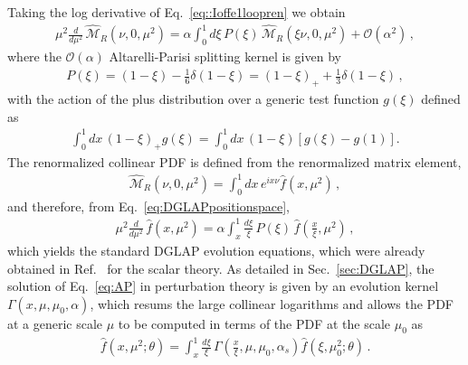 Taking the log derivative of Eq.~\eqref{eq::Ioffe1loopren} we obtain
\begin{align}
        \label{eq:DGLAPpositionspace}
        \mu^2\frac{d}{d\mu^2}\, \widehat{\mathcal{M}}_R\left(\nu,0,\mu^2\right) 
        = \alpha\int_0^1 d\xi\,P\left(\xi\right)\,\widehat{\mathcal{M}}_R\left(\xi\nu,0,\mu^2\right) 
        + \mathcal{O}\left(\alpha^2\right)\, ,
\end{align}
where the $\mathcal{O}\left(\alpha\right)$ Altarelli-Parisi splitting kernel is given by
\begin{align}
        \label{eq:AltarelliParisikernel}
        P\left(\xi\right) = 
        \left(1-\xi\right) - \frac{1}{6}\delta\left(1-\xi\right) = 
        \left(1-\xi\right)_+ + \frac{1}{3}\delta\left(1-\xi\right)\, ,
\end{align}
with the action of the plus distribution over a generic test function $g\left(\xi\right)$ defined as
\begin{align}
	\label{eq:plus}
	\int_0^1 dx\,\left(1-\xi\right)_+g\left(\xi\right) = \int_0^1 dx\,\left(1-\xi\right)\left[g\left(\xi\right) - g\left(1\right)\right].
\end{align}
The renormalized collinear PDF is defined from the renormalized matrix element,
\begin{align}
        \label{eq::PDFs}
        \widehat{\mathcal{M}}_R\left(\nu,0,\mu^2\right) = 
        \int_{0}^{1} dx \, e^{ix\nu}\widehat{f}\left(x,\mu^2\right)\, ,
\end{align}
and therefore, from Eq.~\eqref{eq:DGLAPpositionspace},
\begin{align}
        \label{eq:AP}
        \mu^2\frac{d}{d\mu^2}\, \widehat{f}\left(x, \mu^2\right) = 
        \alpha \int_{x}^{1} \frac{d\xi}{\xi}\,P\left(\xi\right)\,\widehat{f}\left(\frac{x}{\xi}, \mu^2\right)\, ,
\end{align}
which yields the standard DGLAP evolution equations, which were already obtained
in Ref.~\cite{Collins:1980ui} for the scalar theory. As detailed in Sec.~\ref{sec:DGLAP}, the solution of
Eq.~\eqref{eq:AP} in perturbation theory is given by an evolution kernel
$\Gamma\left(x,\mu,\mu_0,\alpha\right)$, which resums the large collinear logarithms and allows the PDF at a generic scale
$\mu$ to be computed in terms of the PDF at the scale $\mu_0$ as
\begin{align}
        \label{eq:solutionDGLAP}
	\widehat{f}\left(x,\mu^2; \theta\right) = \int_x^1 \frac{d\xi}{\xi}\,\Gamma\left(\frac{x}{\xi},\mu,\mu_0,\alpha_s\right)
	\widehat{f}\left(\xi,\mu_0^2; \theta\right)\, .
\end{align}
%

